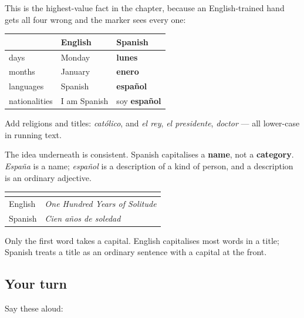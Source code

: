 \begin{grammarlens}[title={Grammar Lens: the four that English capitalises and Spanish does not}]
This is the highest-value fact in the chapter, because an English-trained hand gets all four wrong and the marker sees every one:

\noindent
\begin{tabularx}{\linewidth}{@{}>{\raggedright\arraybackslash}X>{\raggedright\arraybackslash}X>{\raggedright\arraybackslash}X@{}}
\toprule
\textbf{} & \textbf{English} & \textbf{Spanish} \\
\midrule
days & Monday & \textbf{lunes} \\
months & January & \textbf{enero} \\
languages & Spanish & \textbf{español} \\
nationalities & I am Spanish & soy \textbf{español} \\
\bottomrule
\end{tabularx}

Add religions and titles: \emph{católico}, and \emph{el rey}, \emph{el presidente}, \emph{doctor} — all lower-case in running text.

The idea underneath is consistent. Spanish capitalises a \textbf{name}, not a \textbf{category}. \emph{España} is a name; \emph{español} is a description of a kind of person, and a description is an ordinary adjective.
\end{grammarlens}

\begin{grammarlens}[title={Grammar Lens: the title of a book or a film}]
\noindent
\begin{tabularx}{\linewidth}{@{}>{\raggedright\arraybackslash}X>{\raggedright\arraybackslash}X@{}}
\toprule
\textbf{} & \textbf{} \\
\midrule
English & \emph{One Hundred Years of Solitude} \\
Spanish & \emph{Cien años de soledad} \\
\bottomrule
\end{tabularx}

Only the first word takes a capital. English capitalises most words in a title; Spanish treats a title as an ordinary sentence with a capital at the front.
\end{grammarlens}

\subsection*{Your turn}
Say these aloud:

